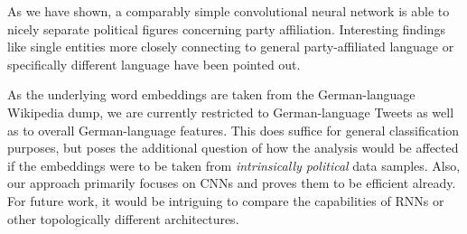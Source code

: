 \documentclass[10pt, oneside]{article}
\begin{document}
\begin{multicols}{2}
As we have shown, a comparably simple convolutional neural network is able to nicely separate political figures concerning party affiliation. Interesting findings like single entities more closely connecting to general party-affiliated language or specifically different language have been pointed out.

As the underlying word embeddings are taken from the German-language Wikipedia dump, we are currently restricted to German-language Tweets as well as to overall German-language features. This does suffice for general classification purposes, but poses the additional question of how the analysis would be affected if the embeddings were to be taken from \emph{intrinsically political} data samples. 
Also, our approach primarily focuses on CNNs and proves them to be efficient already. For future work, it would be intriguing to compare the capabilities of RNNs or other topologically different architectures. 


\end{multicols}



\end{document}
